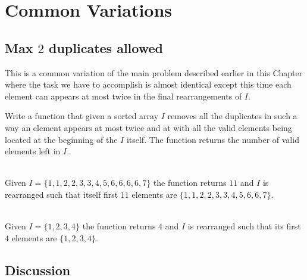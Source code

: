 \section{Common Variations}
\subsection{Max $2$ duplicates allowed}
This is a common variation of the main problem described earlier in this Chapter where the task 
we have to accomplish is almost identical except this time each element can appears at most 
twice in the final rearrangements of $I$.
\begin{exercise}
	Write a function that given a sorted array $I$ removes all the 
	duplicates in such a way an element appears at most twice and at with all the valid elements being located at the beginning of the $I$ itself.
	The function returns the number of valid elements left in $I$.
	
	\label{example:remove_duplicated_sorted_array_inplace:exercice2}
	
		\begin{example}
			\label{example:remove_duplicated_sorted_array_inplace_variation1:example1}
			\hfill \\
			Given $I=\{1,1,2,2,3,3,4,5,6,6,6,6,7\}$ the function returns $11$ and $I$ is rearranged such
			that itself first $11$ elements are $\{1,1,2,2,3,3,4,5,6,6,7\}$.				
		\end{example}
	
		\begin{example}
			\label{example:remove_duplicated_sorted_array_inplace_variation1:example2}
			\hfill \\
			Given $I=\{1,2,3,4\}$ the function returns $4$ and $I$ is rearranged such that its first $4$
			elements are $\{1,2,3,4\}$.	
		\end{example}
	\end{exercise}

\subsection{Discussion}



